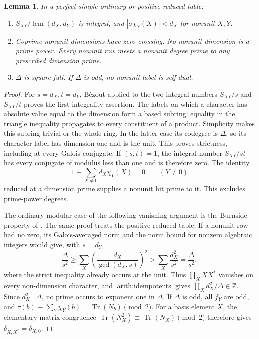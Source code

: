 \documentclass[11pt,a4paper]{article}
\numberwithin{equation}{section}
\newtheorem{lemma}[theorem]{Lemma}
\begin{document}
\begin{lemma}\label{arith:strict}
In a perfect simple ordinary or positive reduced table:
\begin{enumerate}[label=\textup{(\roman*)},leftmargin=*]
\item $S_{XY}/\operatorname{lcm}(d_X,d_Y)$ is integral, and
      $|\sigma\chi_Y(X)|<d_X$ for nonunit $X,Y$.
\item Coprime nonunit dimensions have zero crossing. No nonunit
      dimension is a prime power. Every nonunit row meets a nonunit
      degree prime to any prescribed dimension prime.
\item $\Delta$ is square-full. If $\Delta$ is odd, no nonunit label
      is self-dual.
\end{enumerate}
\end{lemma}
\begin{proof}
For $s=d_X,t=d_Y$, B\'ezout applied to the two integral numbers
$S_{XY}/s$ and $S_{XY}/t$ proves the first integrality assertion.
The labels on which a character has absolute value equal to the
dimension form a based subring: equality in the triangle inequality
propagates to every constituent of a product. Simplicity makes this
subring trivial or the whole ring. In the latter case its codegree
is $\Delta$, so its character label has dimension one and is the
unit. This proves strictness, including at every Galois conjugate.
If $(s,t)=1$, the integral number $S_{XY}/st$ has every conjugate
of modulus less than one and is therefore zero. The identity
\begin{equation}\label{arith:row-zero}
              1+\sum_{X\ne0}d_X\chi_Y(X)=0\qquad(Y\ne0)
\end{equation}
reduced at a dimension prime supplies a nonunit hit prime to it.
This excludes prime-power degrees.

The ordinary modular case of the following vanishing argument is the
Burnside property of \cite{BPBurnside}. The same proof treats the
positive reduced table. If a nonunit row had no zero, its
Galois-averaged norm and the norm bound for nonzero algebraic integers
would give, with $s=d_Y$,
\[
 \frac{\Delta}{s^2}\ge
 \sum_X\left(\frac{d_X}{\gcd(d_X,s)}\right)^2
 >\sum_X\frac{d_X^2}{s^2}=\frac{\Delta}{s^2},
\]
where the strict inequality already occurs at the unit. Thus
$\prod_X XX^*$ vanishes on every non-dimension character, and
\eqref{arith:idempotents} gives
$\prod_Xd_X^2/\Delta\in\mathbb Z$. Since $d_X^2\mid\Delta$,
no prime occurs to exponent one in $\Delta$.
If $\Delta$ is odd, all $f_Y$ are odd, and
$\tau(b)\equiv\sum_Y\chi_Y(b)=\operatorname{Tr}(N_b)\pmod2$.
For a basis element $X$, the elementary matrix congruence
$\operatorname{Tr}(N_X^2)\equiv\operatorname{Tr}(N_X)\pmod2$
therefore gives $\delta_{X,X^*}=\delta_{X,0}$.
\end{proof}
\end{document}
